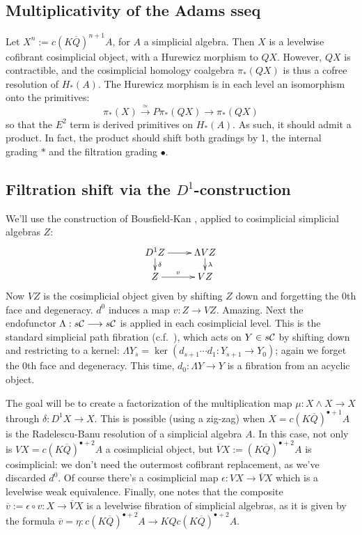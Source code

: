 \documentclass[10pt]{article}
\newcommand{\Comm}{\calC}
\begin{document}
\begin{Adams Muliplicativity}
\section{Multiplicativity of the Adams sseq}
Let $X^n:=c(K\overline{Q})^{n+1}A$, for $A$ a simplicial algebra. Then $X$ is a levelwise cofibrant cosimplicial object, with a Hurewicz morphism to $QX$. However, $QX$ is contractible, and the cosimplicial homology coalgebra $\pi_*(QX)$ is thus a cofree resolution of $H_*(A)$. The Hurewicz morphism is in each level an isomorphism onto the primitives:
\[\pi_*(X)\overset{\simeq}{\to}P\pi_*(QX)\overset{}{\to}\pi_*(QX)\]
so that the $E^2$ term is derived primitives on $H_*(A)$. As such, it should admit a product. In fact, the product should shift both gradings by 1, the internal grading $*$ and the filtration grading $\bullet$.

\subsection{Filtration shift via the $D^1$-construction}
We'll use the construction of Bousfield-Kan \cite{BK_pairings_products.pdf,BK_pairings.pdf}, applied to cosimplicial simplicial algebras $Z$:
\[\xymatrix@R=4mm{
D^1Z\ar[r]
\ar[d]^-{\delta}
&%
\Lambda VZ\ar[d]^-{\lambda}
\\%
Z\ar[r]^-{v}
&%
VZ%
}\]
Now $VZ$ is the cosimplicial object given by shifting $Z$ down and forgetting the 0th face and degeneracy. $d^0$ induces a map $v:Z\to VZ$. Amazing. Next the endofunctor $\Lambda:s\Comm\to s\Comm$ is applied in each cosimplicial level. This is the standard simplicial path fibration (c.f.\ \cite[p.82]{BousKanSSeq.pdf}), which acts on $Y\in s\Comm$ by shifting down and restricting to a kernel: $\Lambda Y_s=\ker(d_{s+1}\cdots d_1:Y_{s+1}\to Y_0)$; again we forget the 0th face and degeneracy. This time, $d_0:\Lambda Y\to Y$ is a fibration from an acyclic object.

The goal will be to create a factorization of the multiplication map $\mu:X\wedge  X\to X$ through $\delta:D^1X\to X$. This is possible (using a zig-zag) when $X=c(K\overline{Q})^{\bullet+1}A$ is the Radelescu-Banu resolution of a simplicial algebra $A$. In this case, not only is $VX=c(K\overline{Q})^{\bullet+2}A$ a cosimplicial object, but $\overline{V}X:=(K\overline{Q})^{\bullet+2}A$ is cosimplicial: we don't need the outermost cofibrant replacement, as we've discarded $d^0$. Of course there's a cosimplicial map $\epsilon:VX\to \overline{V}X$ which is a levelwise weak equivalence. Finally, one notes that the composite $\overline{v}:=\epsilon\circ v:X\to \overline{V}X$ is a levelwise fibration of simplicial algebras, as it is given by the formula $\overline{v}=\eta:c(K\overline{Q})^{\bullet+2}A\to KQc(K\overline{Q})^{\bullet+2}A$. 


\end{Adams Muliplicativity}
\end{document}
